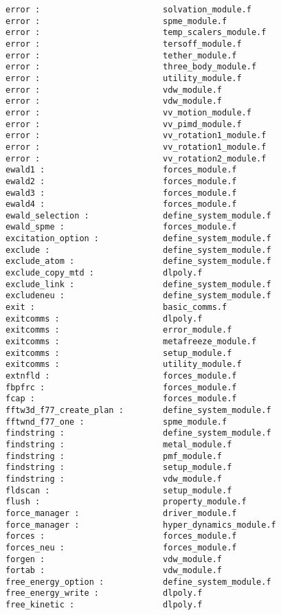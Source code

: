 \begin{verbatim}
error :                         solvation_module.f
error :                         spme_module.f
error :                         temp_scalers_module.f
error :                         tersoff_module.f
error :                         tether_module.f
error :                         three_body_module.f
error :                         utility_module.f
error :                         vdw_module.f
error :                         vdw_module.f
error :                         vv_motion_module.f
error :                         vv_pimd_module.f
error :                         vv_rotation1_module.f
error :                         vv_rotation1_module.f
error :                         vv_rotation2_module.f
ewald1 :                        forces_module.f
ewald2 :                        forces_module.f
ewald3 :                        forces_module.f
ewald4 :                        forces_module.f
ewald_selection :               define_system_module.f
ewald_spme :                    forces_module.f
excitation_option :             define_system_module.f
exclude :                       define_system_module.f
exclude_atom :                  define_system_module.f
exclude_copy_mtd :              dlpoly.f
exclude_link :                  define_system_module.f
excludeneu :                    define_system_module.f
exit :                          basic_comms.f
exitcomms :                     dlpoly.f
exitcomms :                     error_module.f
exitcomms :                     metafreeze_module.f
exitcomms :                     setup_module.f
exitcomms :                     utility_module.f
extnfld :                       forces_module.f
fbpfrc :                        forces_module.f
fcap :                          forces_module.f
fftw3d_f77_create_plan :        define_system_module.f
fftwnd_f77_one :                spme_module.f
findstring :                    define_system_module.f 
findstring :                    metal_module.f 
findstring :                    pmf_module.f 
findstring :                    setup_module.f 
findstring :                    vdw_module.f 
fldscan :                       setup_module.f
flush :                         property_module.f
force_manager :                 driver_module.f
force_manager :                 hyper_dynamics_module.f
forces :                        forces_module.f
forces_neu :                    forces_module.f
forgen :                        vdw_module.f
fortab :                        vdw_module.f
free_energy_option :            define_system_module.f
free_energy_write :             dlpoly.f
free_kinetic :                  dlpoly.f

\end{verbatim}
